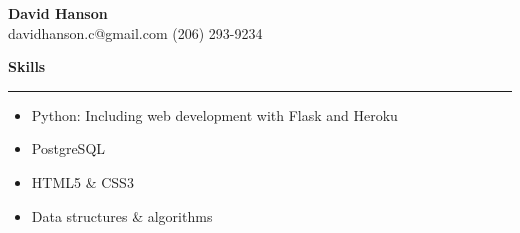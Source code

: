 \documentclass[letterpaper,6pt]{article}
\begin{document}
\begin{center}
{\Large \textbf{David Hanson}}\\
\href{https://www.linkedin.com/in/david-hanson-72561869/}{\faLinkedin}
\href{https://github.com/davidhansonc}{\faGithub}
\href{mailto:davidhanson.c@gmail.com}{\faEnvelope} davidhanson.c@gmail.com 
\textbar{} (206) 293-9234
\end{center}

{\large \textbf{Skills}}
\vspace{0.5mm}
\hrule
\vspace{2mm}
\begin{itemize}[noitemsep,topsep=0pt]
    \item  Python: Including web development with Flask and Heroku
    \item  PostgreSQL
    \item  HTML5 \& CSS3
    \item  Data structures \& algorithms
\end{itemize}
\vspace{5mm}
\end{document}
